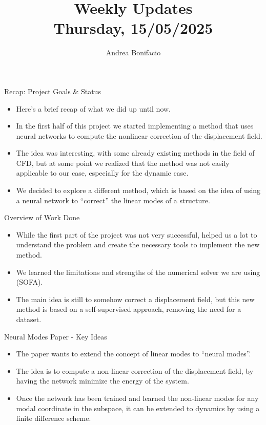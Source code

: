 \documentclass{beamer}
\title{Weekly Updates\\
\tiny{Thursday, 15/05/2025}}
\author{Andrea Bonifacio}
\date{}
\begin{document}
\begin{frame}
\titlepage
\end{frame}

\begin{frame}{Recap: Project Goals \& Status}
    \begin{itemize}
        \item Here's a brief recap of what we did up until now.
        \item In the first half of this project we started implementing a method that uses neural networks to compute the nonlinear correction of the displacement field.
        \item The idea was interesting, with some already existing methods in the field of CFD, but at some point we realized that the method was not easily applicable to our case, especially for the dynamic case.
        \item We decided to explore a different method, which is based on the idea of using a neural network to ``correct'' the linear modes of a structure.
    \end{itemize}
\end{frame}

\begin{frame}{Overview of Work Done}
    \begin{itemize}
        \item While the first part of the project was not very successful, helped us a lot to understand the problem and create the necessary tools to implement the new method.
        \item We learned the limitations and strengths of the numerical solver we are using (SOFA).
        \item The main idea is still to somehow correct a displacement field, but this new method is based on a self-supervised approach, removing the need for a dataset.
    \end{itemize}
\end{frame}



\begin{frame}{Neural Modes Paper - Key Ideas}
    \begin{itemize}
        \item The paper wants to extend the concept of linear modes to ``neural modes''.
        \item The idea is to compute a non-linear correction of the displacement field, by having the network minimize the energy of the system.
        \item Once the network has been trained and learned the non-linear modes for any modal coordinate in the subspace, it can be extended to dynamics by using a finite difference scheme.
    \end{itemize}
\end{frame}
\end{document}
